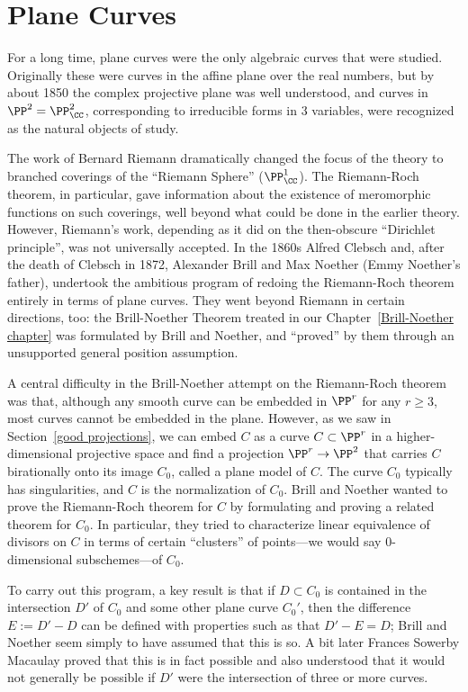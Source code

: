 

\chapter{Plane Curves}
\label{PlaneCurvesChapter}


For a long time, plane curves were the only algebraic curves that were studied. Originally these were curves in the affine plane over the real numbers, but by about 1850 the complex projective plane was well understood, and curves in $\PP^2 = \PP^2_\CC$, corresponding to irreducible forms in 3 variables, were recognized as the natural objects of study. 

The work of Bernard Riemann dramatically changed the focus of the theory to branched coverings of   the ``Riemann Sphere'' ($\PP^1_\CC$). The Riemann-Roch theorem, in particular, gave information about the existence of meromorphic functions on such coverings, well beyond what could be done in the earlier theory. However, Riemann's work, depending as it did on the then-obscure ``Dirichlet principle'', was not universally accepted. In the 1860s Alfred Clebsch and, after the death of Clebsch  in 1872, Alexander Brill and Max Noether (Emmy Noether's father), undertook the ambitious program of redoing the Riemann-Roch theorem entirely in terms of plane curves. They went beyond Riemann in certain directions, too: the Brill-Noether Theorem treated in our Chapter~\ref{Brill-Noether chapter} was formulated by Brill and Noether, and ``proved'' by them through an unsupported general position assumption. 

A central difficulty in the Brill-Noether attempt on the Riemann-Roch theorem was that,
although any smooth curve can be embedded in $\PP^r$ for any $r \geq 3$, most curves cannot be embedded in the plane. 
However, as we saw in Section~\ref{good projections}, we can embed $C$ as a curve $ C \subset \PP^r$ in a higher-dimensional projective space and find a projection $\PP^r \to \PP^2$ that carries $C$ birationally onto its image $C_0$, called a plane model of $C$. The curve $C_0$ typically has singularities, and $C$ is the normalization of $C_0$. Brill and Noether wanted to prove the Riemann-Roch theorem for $C$ by formulating and proving a related theorem for $C_0$. In particular, they tried to characterize linear equivalence of divisors on $C$ in terms of certain ``clusters'' of points---we would say 0-dimensional subschemes---of $C_0$. 

To carry out this program, a key result is that if $D\subset C_0$ is contained in the intersection
$D'$ of $C_0$ and some other plane curve $C_0'$, then the difference 
$E := D'-D$ can be defined with properties such as that $D'-E = D$; Brill and Noether seem simply to have assumed that this is so. A bit later Frances Sowerby Macaulay proved that this is in fact possible  and also understood that it would not generally be possible if $D'$ were the intersection of three or more curves. 


